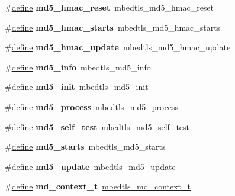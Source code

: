 \begin{DoxyCompactItemize}
\#\hyperlink{structdefine}{define} {\bfseries md5\+\_\+hmac\+\_\+reset}~mbedtls\+\_\+md5\+\_\+hmac\+\_\+reset
\item 
\mbox{\label{compat-1_83_8h_afdbf29f300e58f10e7d3a7047bc2bf07}} 
\#\hyperlink{structdefine}{define} {\bfseries md5\+\_\+hmac\+\_\+starts}~mbedtls\+\_\+md5\+\_\+hmac\+\_\+starts
\item 
\mbox{\label{compat-1_83_8h_a0911aa806a9551912091b44f80602ac6}} 
\#\hyperlink{structdefine}{define} {\bfseries md5\+\_\+hmac\+\_\+update}~mbedtls\+\_\+md5\+\_\+hmac\+\_\+update
\item 
\mbox{\label{compat-1_83_8h_a0d22143bad997b2989ab352597dbce8f}} 
\#\hyperlink{structdefine}{define} {\bfseries md5\+\_\+info}~mbedtls\+\_\+md5\+\_\+info
\item 
\mbox{\label{compat-1_83_8h_af7853ca1de489113a86f9bdaf3dbe5b8}} 
\#\hyperlink{structdefine}{define} {\bfseries md5\+\_\+init}~mbedtls\+\_\+md5\+\_\+init
\item 
\mbox{\label{compat-1_83_8h_a135f3d6844724dafa7ea83407eccda86}} 
\#\hyperlink{structdefine}{define} {\bfseries md5\+\_\+process}~mbedtls\+\_\+md5\+\_\+process
\item 
\mbox{\label{compat-1_83_8h_a7e4760d77a74c17f21371f3822e97acb}} 
\#\hyperlink{structdefine}{define} {\bfseries md5\+\_\+self\+\_\+test}~mbedtls\+\_\+md5\+\_\+self\+\_\+test
\item 
\mbox{\label{compat-1_83_8h_a4415a6251f382dec8ae29cffc93b2e63}} 
\#\hyperlink{structdefine}{define} {\bfseries md5\+\_\+starts}~mbedtls\+\_\+md5\+\_\+starts
\item 
\mbox{\label{compat-1_83_8h_abe467932b7e2f76dbfcb24ff4afe6127}} 
\#\hyperlink{structdefine}{define} {\bfseries md5\+\_\+update}~mbedtls\+\_\+md5\+\_\+update
\item 
\mbox{\label{compat-1_83_8h_a1b9037355545fa95369c2bc37f9603c0}} 
\#\hyperlink{structdefine}{define} {\bfseries md\+\_\+context\+\_\+t}~\hyperlink{structmbedtls__md__context__t}{mbedtls\+\_\+md\+\_\+context\+\_\+t}

\end{DoxyCompactItemize}
